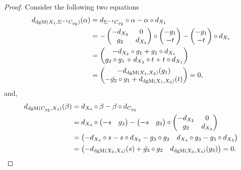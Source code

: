 \begin{proof}
    Consider the following two equations
    \begin{align*}
        d_{\operatorname{dgM}(X_1, \Sigma^{-1} C_{g_2})}(\alpha)
        &= d_{\Sigma^{-1} C_{g_2}} \circ \alpha - \alpha \circ d_{X_1} \\
        &= -
        \begin{pmatrix}
            - d_{X_2} & 0 \\
            g_2 & d_{X_3}
        \end{pmatrix}
        \circ
        \begin{pmatrix}
            - g_1 \\
            - t
        \end{pmatrix}
        -
        \begin{pmatrix}
            - g_1 \\
            - t
        \end{pmatrix}
        \circ
        d_{X_1} \\
        &=
        \begin{pmatrix}
            - d_{X_2} \circ g_1 + g_1 \circ d_{X_1} \\
            g_2 \circ g_1 + d_{X_3} \circ t + t \circ d_{X_1}
        \end{pmatrix} \\
        &=
        \begin{pmatrix}
            - d_{\operatorname{dgM}(X_1, X_2)}(g_1) \\
            - \bar{g_2} \circ g_1 + d_{\operatorname{dgM}(X_1, X_3)}(t)
        \end{pmatrix}
        =
        0,
    \end{align*}
    and,
    \begin{align*}
        d_{\operatorname{dgM}(C_{g_2}, X_4)}(\beta)
        &= d_{X_4} \circ \beta - \beta \circ d_{C_{g_2}} \\
        &= d_{X_4} \circ
        \begin{pmatrix}
            - s & g_3
        \end{pmatrix}
        -
        \begin{pmatrix}
            - s & g_3
        \end{pmatrix}
        \circ
        \begin{pmatrix}
            - d_{X_2} & 0 \\
            g_2 & d_{X_3}
        \end{pmatrix} \\
        &=
        \begin{pmatrix}
            - d_{X_4} \circ s - s \circ d_{X_2} - g_3 \circ g_2 & d_{X_4} \circ g_3 - g_3 \circ d_{X_3}
        \end{pmatrix} \\
        &=
        \begin{pmatrix}
            - d_{\operatorname{dgM}(X_2, X_4)}(s) + \bar{g_3} \circ g_2 & d_{\operatorname{dgM}(X_3, X_4)}(g_3)
        \end{pmatrix}
        = 0.
    \end{align*}
    

\end{proof}
